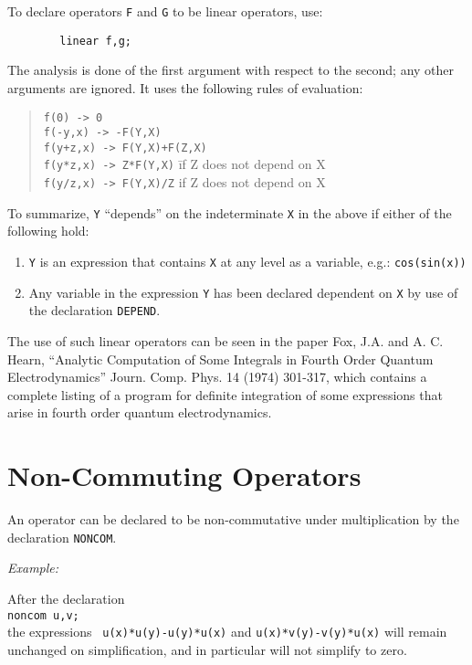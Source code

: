 \documentclass[11pt,letterpaper]{book}
\makeatletter
\newcommand{\underscore}{\_}
\newcommand{\ttindex}[1]{{\renewcommand{\_}{\protect\underscore}%
                          \index{#1@{\tt #1}}}}
\makeatother
\begin{document}
To declare operators {\tt F} and {\tt G} to be linear operators,
use:\ttindex{LINEAR}
{\small\begin{verbatim}
        linear f,g;
\end{verbatim}}
The analysis is done of the first argument with respect to the second; any
other arguments are ignored. It uses the following rules of evaluation:
\begin{quote}
\begin{tabbing}
{\tt    f(0)      ->   0} \\
{\tt    f(-y,x)   ->  -F(Y,X)} \\
{\tt    f(y+z,x)  ->   F(Y,X)+F(Z,X)} \\
{\tt    f(y*z,x)  ->   Z*F(Y,X)} \hspace{0.5in}\= if Z does not depend on X \\
{\tt    f(y/z,x)  ->   F(Y,X)/Z} \> if Z does not depend on X
\end{tabbing}
\end{quote}
To summarize, {\tt Y} ``depends'' on the indeterminate {\tt X} in the above
if either of the following hold:
\begin{enumerate}
\item {\tt Y} is an expression that contains {\tt X} at any level as a
      variable, e.g.: {\tt cos(sin(x))}

\item Any variable in the expression {\tt Y} has been declared dependent on
      {\tt X} by use of the declaration {\tt DEPEND}.
\end{enumerate}
The use of such linear operators can be seen in the
paper Fox, J.A. and A. C. Hearn, ``Analytic Computation of Some Integrals
in Fourth Order Quantum Electrodynamics'' Journ. Comp. Phys. 14 (1974)
301-317, which contains a complete listing of a program for definite
integration of some expressions that arise in fourth
order quantum electrodynamics.

\section{Non-Commuting Operators}
An operator can be declared to be non-commutative under multiplication by
the declaration {\tt NONCOM}.\ttindex{NONCOM}

{\it Example:}

After the declaration \\
{\tt noncom u,v;}\\
the expressions {\tt
u(x)*u(y)-u(y)*u(x)} and {\tt u(x)*v(y)-v(y)*u(x)} will remain unchanged
on simplification, and in particular will not simplify to zero.
\end{document}
